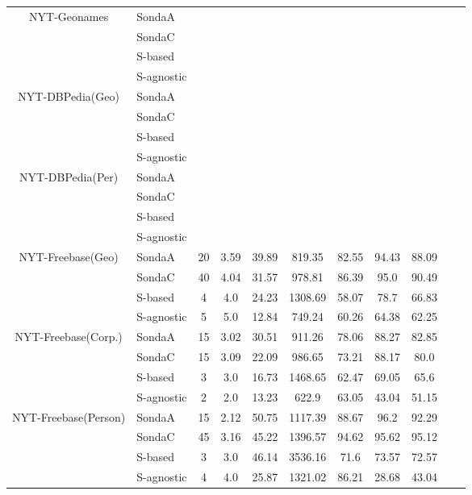 \begin{center}
\begin{table*}[h]
\begin{tabular}{|c|l|c|c|c|c|c|c|c|c|c|}
\multirow{4}{*}{NYT-Geonames} & SondaA   \\
											& SondaC  \\
											& S-based    \\
 											& S-agnostic     \\ \hline 											


\multirow{4}{*}{NYT-DBPedia(Geo)} & SondaA    \\
											& SondaC  \\
											& S-based \\
 											& S-agnostic       \\ \hline 											
 		
\multirow{4}{*}{NYT-DBPedia(Per)} & SondaA   \\
											& SondaC  \\
											& S-based  \\
 											& S-agnostic       \\ \hline 											
 		
 		
\multirow{4}{*}{NYT-Freebase(Geo)} & SondaA  & 20 & 3.59   & 39.89  & 819.35     & 82.55 & 94.43 & 88.09 \\
											& SondaC    & 40 & 4.04   & 31.57  & 978.81   & 86.39 & 95.0 & 90.49\\
											& S-based     & 4 & 4.0   & 24.23  & 1308.69   & 58.07 & 78.7 & 66.83\\
 											& S-agnostic    & 5 & 5.0   & 12.84  & 749.24    & 60.26 & 64.38 & 62.25   \\ \hline 											
 

\multirow{4}{*}{NYT-Freebase(Corp.)} & SondaA   & 15 & 3.02   & 30.51  & 911.26  & 78.06 & 88.27 & 82.85   \\
											 & SondaC   & 15 & 3.09   & 22.09  & 986.65  & 73.21 & 88.17 & 80.0\\
											& S-based     & 3 & 3.0   & 16.73  & 1468.65   & 62.47 & 69.05 & 65.6\\
 											& S-agnostic   & 2 & 2.0   & 13.23  & 622.9       & 63.05 & 43.04 & 51.15    \\ \hline 					
 											
\multirow{4}{*}{NYT-Freebase(Person)} & SondaA    & 15 & 2.12   & 50.75  & 1117.39   & 88.67 & 96.2 & 92.29\\
											& SondaC  &   45 & 3.16   & 45.22  & 1396.57  & 94.62 & 95.62 & 95.12\\
											& S-based       & 3 & 3.0   & 46.14  & 3536.16 &   71.6 & 73.57 & 72.57 \\
 											& S-agnostic    & 4 & 4.0   & 25.87  & 1321.02    & 86.21 & 28.68 & 43.04   \\ \hline 								

\end{tabular}  
\end{table*} 
\end{center}

